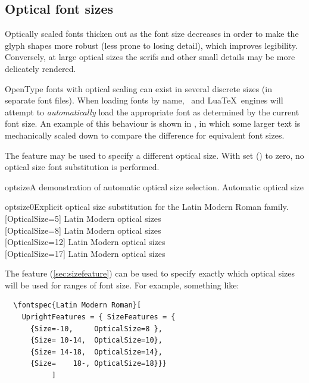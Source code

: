 \documentclass[a4paper]{l3doc}
\begin{document}
\subsection{Optical font sizes} \label{sec:opticalsize}

Optically scaled fonts thicken out as the font size decreases
in order to make the glyph shapes more robust (less prone to losing
detail), which improves legibility. Conversely, at large optical
sizes the serifs and other small details may be more delicately
rendered.

OpenType fonts with optical scaling can exist in
several discrete sizes (in separate font files).
When loading fonts by name, \XeTeX\ and Lua\TeX\ engines will attempt to
\emph{automatically} load the appropriate font as determined by the current font size.
An example of this behaviour is shown in , in which some larger text is
mechanically scaled down to compare the difference for equivalent font sizes.

The  feature may be used to specify a different optical size.
With  set ()
to zero, no optical size font substitution is performed.

\begin{Lexample}{optsize}{A demonstration of automatic optical size selection.}
   Automatic optical size                  \\
\end{Lexample}

\begin{Lexample}{optsize0}{Explicit optical size substitution for the Latin Modern Roman family.}
  [OpticalSize=5]
   Latin Modern optical sizes                \\
  [OpticalSize=8]
   Latin Modern optical sizes                \\
  [OpticalSize=12]
   Latin Modern optical sizes                \\
  [OpticalSize=17]
   Latin Modern optical sizes
\end{Lexample}

The  feature (\vref{sec:sizefeature}) can be
used to specify exactly which optical sizes will be used for ranges
of font size. For example, something like:
\begin{Verbatim}
  \fontspec{Latin Modern Roman}[
    UprightFeatures = { SizeFeatures = {
      {Size=-10,     OpticalSize=8 },
      {Size= 10-14,  OpticalSize=10},
      {Size= 14-18,  OpticalSize=14},
      {Size=    18-, OpticalSize=18}}}
           ]
\end{Verbatim}
\end{document}
